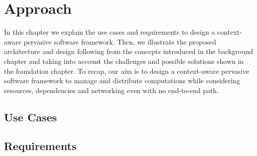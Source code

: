
 \chapter{Approach}\label{chapter:Approach}
 In this chapter we explain the use cases and requirements to design a context-aware pervasive software framework. Then, we illustrate the  proposed architecture and design following from the concepts introduced in the background chapter and taking into account the challenges and possible solutions shown in the foundation chapter. To recap,  our aim is to design a context-aware pervasive software framework to manage and distribute computations while considering resources, dependencies and networking even with no end-to-end path.



\section{Use Cases}
\section{Requirements}
	


